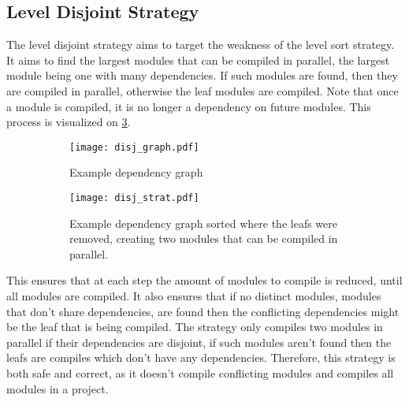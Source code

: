 

\pagebreak
\subsection{Level Disjoint Strategy} \label{sub:design disjoint strategy}

The level disjoint strategy aims to target the weakness of the level sort
strategy. It aims to find the largest modules that can be compiled in parallel,
the largest module being one with many dependencies. If such modules are found,
then they are compiled in parallel, otherwise the leaf modules are compiled.
Note that once a module is compiled, it is no longer a dependency on future
modules. This process is visualized on \cref{subfig:disj strat}.
\begin{figure}[H]
  \begin{subfigure}[t]{0.5\textwidth}
    \centering
    \texttt{[image: disj\_graph.pdf]}
    \caption{Example dependency graph}
    \label{fig:example disj dep graph}
  \end{subfigure} \hfill
  \begin{subfigure}[t]{0.40\textwidth}
    \centering
    \texttt{[image: disj\_strat.pdf]}
    \caption{Example dependency graph sorted where the leafs were removed,
    creating two modules that can be compiled in parallel. }
    \label{fig:example disj strat}
  \end{subfigure}
  \caption{}
  \label{subfig:disj strat}
\end{figure}

This ensures that at each step the amount of modules to compile is reduced,
until all modules are compiled. It also ensures that if no distinct modules,
modules that don't share dependencies, are found then the conflicting
dependencies might be the leaf that is being compiled. The strategy only
compiles two modules in parallel if their dependencies are disjoint, if such
modules aren't found then the leafs are compiles which don't have any
dependencies. Therefore, this strategy is both safe and correct, as it doesn't
compile conflicting modules and compiles all modules in a project.

